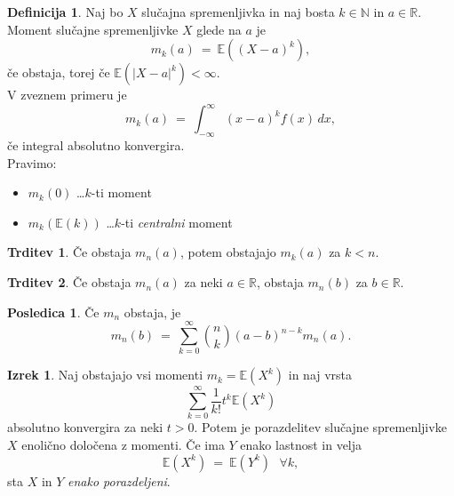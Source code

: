 \documentclass[11pt]{article}
\newcommand{\E}{\mathbb{E}}
\newcommand{\R}{\mathbb{R}}
\newcommand{\1}{\mathbbm{1}}
\newcommand{\N}{\mathbb{N}}
\theoremstyle{definition}
\newtheorem{definicija}{Definicija}[section]
\theoremstyle{definition}
\newtheorem{trditev}{Trditev}[section]
\theoremstyle{definition}
\newtheorem{izrek}{Izrek}[section]
\newtheorem*{posledica}{Posledica}
\begin{document}
\begin{definicija}

Naj bo $X$ slučajna spremenljivka in naj bosta $k \in \N$ in $a \in \R$. Moment slučajne spremenljivke $X$ glede na $a$ je
$$m_k(a) ~=~ \E((X-a)^k),$$
če obstaja, torej če $\E(|X-a|^k) < \infty$. \\

V zveznem primeru je
$$m_k(a) ~=~ \int_{-\infty}^\infty (x-a)^k f(x)\,dx,$$
če integral absolutno konvergira. \\

Pravimo:
\begin{itemize}
	\item $m_k(0)$ \ldots $k$-ti moment
	\item $m_k(\E(k))$ \ldots $k$-ti \textit{centralni} moment
\end{itemize}

\end{definicija}
\vspace{0.5cm}

\begin{trditev}

Če obstaja $m_n(a)$, potem obstajajo $m_k(a)$ za $k < n$.

\end{trditev}
\vspace{0.5cm}

\begin{trditev}

Če obstaja $m_n(a)$ za neki $a \in \R$, obstaja $m_n(b)$ za $b \in \R$.

\end{trditev}
\vspace{0.5cm}

\begin{posledica}

Če $m_n$ obstaja, je 
$$m_n(b) ~=~ \sum_{k=0}^\infty \binom{n}{k} (a-b)^{n-k} m_n(a).$$

\end{posledica}
\vspace{0.5cm}

\pagebreak
\begin{izrek}

Naj obstajajo vsi momenti $m_k = \E(X^k)$ in naj vrsta
$$\sum_{k=0}^\infty \frac{1}{k!} t^k \E(X^k)$$
absolutno konvergira za neki $t>0$. Potem je porazdelitev slučajne spremenljivke $X$ enolično določena z momenti. Če ima $Y$ enako lastnost in velja
$$\E(X^k) ~=~ \E(Y^k) ~~~\forall k,$$
sta $X$ in $Y$ \textit{enako porazdeljeni}.

\end{izrek}
\vspace{0.5cm}
\end{document}
